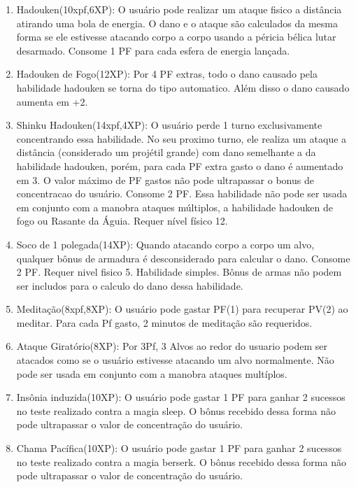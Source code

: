 \begin{enumerate}
  	\item Hadouken(10xpf,6XP): O usuário pode realizar um ataque fisico a distância atirando uma bola de energia. O dano e o ataque são calculados da mesma forma se ele estivesse atacando corpo a corpo usando a péricia bélica lutar desarmado. Consome 1 PF para cada esfera de energia lançada. 
  
\item Hadouken de Fogo(12XP): Por 4 PF extras, todo o dano causado pela habilidade hadouken se torna do tipo automatico. Além disso o dano causado aumenta em +2.  

  	\item Shinku Hadouken(14xpf,4XP): O usuário perde 1 turno exclusivamente concentrando essa habilidade. No seu proximo turno, ele realiza um ataque a distância (considerado um projétil grande) com dano semelhante a da habilidade hadouken, porém, para cada PF extra gasto o dano é aumentado em 3. O valor máximo de PF gastos não pode ultrapassar o bonus de concentracao do usuário. Consome 2 PF. Essa habilidade não pode ser usada em conjunto com a manobra ataques múltiplos, a habilidade hadouken de fogo ou Rasante da Águia. Requer nível físico 12.

  	\item Soco de 1 polegada(14XP): Quando atacando corpo a corpo um alvo, qualquer bônus de armadura é desconsiderado para calcular o dano. Consome 2 PF. Requer nivel fisico 5. Habilidade simples. Bônus de armas não podem ser includos para o calculo do dano dessa habilidade.
  	
  	\item Meditação(8xpf,8XP): O usuário pode gastar PF(1) para recuperar PV(2) ao meditar. Para cada Pf gasto, 2 minutos de meditação são requeridos. 
  
  	\item Ataque Giratório(8XP): Por 3Pf, 3 Alvos ao redor do usuario podem ser atacados como se o usuário estivesse atacando um alvo normalmente. Não pode ser usada em conjunto com a manobra ataques multíplos.

	\item Insônia induzida(10XP): O usuário pode gastar 1 PF para ganhar 2 sucessos no teste realizado contra a magia sleep. O bônus recebido dessa forma não pode ultrapassar o valor de concentração do usuário.

	\item Chama Pacífica(10XP): O usuário pode gastar 1 PF para ganhar 2 sucessos no teste realizado contra a magia berserk. O bônus recebido dessa forma não pode ultrapassar o valor de concentração do usuário.  


\end{enumerate}
